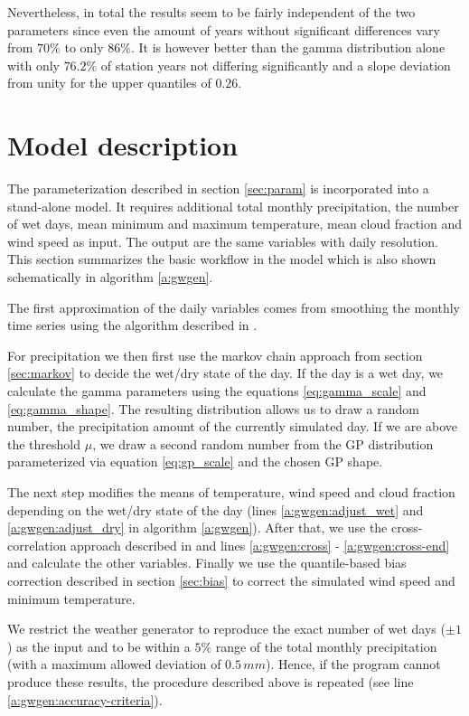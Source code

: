 \begin{refsection}
Nevertheless, in total the results seem to be fairly independent of the two parameters since even the amount of years without significant differences vary from $70\%$ to only $86\%$. It is however better than the gamma distribution alone with only $76.2\%$ of station years not differing significantly and a slope deviation from unity for the upper quantiles of $0.26$.


\section{Model description} \label{sec:model}
The parameterization described in section \ref{sec:param} is incorporated into a stand-alone model. It requires additional total monthly precipitation, the number of wet days, mean minimum and maximum temperature, mean cloud fraction and wind speed as input. The output are the same variables with daily resolution. This section summarizes the basic workflow in the model which is also shown schematically in algorithm \autoref{a:gwgen}.

The first approximation of the daily variables comes from smoothing the monthly time series using the algorithm described in \cite{RymesMyers2001}.

For precipitation we then first use the markov chain approach from section \ref{sec:markov} to decide the wet/dry state of the day. If the day is a wet day, we calculate the gamma parameters using the equations \eqref{eq:gamma_scale} and \eqref{eq:gamma_shape}. The resulting distribution allows us to draw a random number, the precipitation amount of the currently simulated day. If we are above the threshold $\mu$, we draw a second random number from the GP distribution parameterized via equation \eqref{eq:gp_scale} and the chosen GP shape.

The next step modifies the means of temperature, wind speed and cloud fraction depending on the wet/dry state of the day (lines \ref{a:gwgen:adjust_wet} and \ref{a:gwgen:adjust_dry} in algorithm \ref{a:gwgen}). After that, we use the cross-correlation approach described in \cite{Richardson1981} and lines \ref{a:gwgen:cross} - \ref{a:gwgen:cross-end} and calculate the other variables. Finally we use the quantile-based bias correction described in section \ref{sec:bias} to correct the simulated wind speed and minimum temperature.

We restrict the weather generator to reproduce the exact number of wet days ($\pm1$) as the input and to be within a $5\%$ range of the total monthly precipitation (with a maximum allowed deviation of $0.5\,\unit{mm}$). Hence, if the program cannot produce these results, the procedure described above is repeated (see line \ref{a:gwgen:accuracy-criteria}).


\end{refsection}
